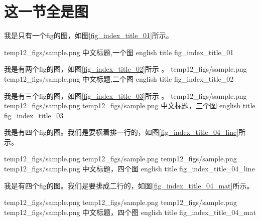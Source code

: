 \section{这一节全是图}

我是只有一个fig的图，如图\ref{fig_index_title_01}所示。

\mfigOne
{\figsizebig}{temp12_figs/sample.png}
{中文标题,一个图}
{english title }
{fig_index_title_01}

我是有两个fig的图，如图\ref{fig_index_title_02}所示 。
\mfigTwo
{\figsizemid}{temp12_figs/sample.png}
{\figsizemid}{temp12_figs/sample.png}
{中文标题,二个图}
{english title }
{fig_index_title_02}

我是有三个fig的图，如图\ref{fig_index_title_03}所示 。
\mfigThr
{\figsizesma}{temp12_figs/sample.png}
{\figsizesma}{temp12_figs/sample.png}
{\figsizesma}{temp12_figs/sample.png}
{中文标题，三个图}
{english title }
{fig_index_title_03}

我是有四个fig的图。我们是要横着排一行的，如图\ref{fig_index_title_04_line}所示。

\mfigFouLin
{\figsizetin}
{temp12_figs/sample.png}
{temp12_figs/sample.png}
{temp12_figs/sample.png}
{temp12_figs/sample.png}
{中文标题，四个图}
{english title }
{fig_index_title_04_line}

我是有四个fig的图。我们是要排成二行的，如图\ref{fig_index_title_04_mat}所示。

\mfigFouMat
{\figsizetin}
{temp12_figs/sample.png}
{temp12_figs/sample.png}
{temp12_figs/sample.png}
{temp12_figs/sample.png}
{中文标题，四个图}
{english title }
{fig_index_title_04_mat}
